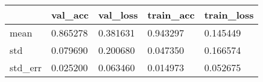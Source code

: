\begin{tabular}{|l|l|l|l|l|}
\toprule \hline
 & val\_acc & val\_loss & train\_acc & train\_loss \\ \hline
\midrule
mean & 0.865278 & 0.381631 & 0.943297 & 0.145449 \\ \hline
std & 0.079690 & 0.200680 & 0.047350 & 0.166574 \\ \hline
std\_err & 0.025200 & 0.063460 & 0.014973 & 0.052675 \\ \hline
\bottomrule
\end{tabular}

